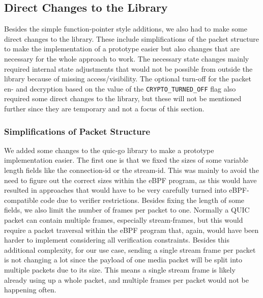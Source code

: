 \subsection{Direct Changes to the Library}

Besides the simple function-pointer style additions, we also had to make some direct changes to the library.
These include simplifications of the packet structure to make the implementation of a prototype easier 
but also changes that are necessary for the whole approach to work.
The necessary state changes mainly required internal state adjustments that would not be possible from outside 
the library because of missing access/visibility.
The optional turn-off for the packet en- and decryption based on the value of the \verb|CRYPTO_TURNED_OFF| flag
also required some direct changes to the library, but these will not be mentioned further since they are temporary
and not a focus of this section.

\subsubsection*{Simplifications of Packet Structure}
We added some changes to the quic-go library to make a prototype implementation easier.
The first one is that we fixed the sizes of some variable length fields like the connection-id or the stream-id.
This was mainly to avoid the need to figure out the correct sizes within the eBPF program, as this would have 
resulted in approaches that would have to be very carefully turned into eBPF-compatible code due to verifier
restrictions.
Besides fixing the length of some fields, we also limit the number of frames per packet to one.
Normally a QUIC packet can contain multiple frames, especially stream-frames, but this would require 
a packet traversal within the eBPF program that, again, would have been harder to implement considering all
verification constraints.
Besides this additional complexity, for our use case, sending a single stream frame per packet is not changing 
a lot since the payload of one media packet will be split into multiple packets due to its size.
This means a single stream frame is likely already using up a whole packet, and multiple frames per packet would 
not be happening often.

